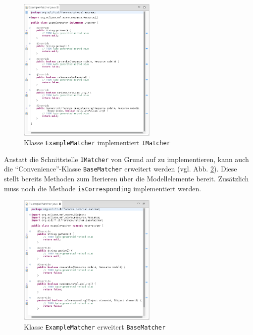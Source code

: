 \begin{figure}[H]
\centering
\includegraphics[width=0.6\textwidth]{matching/graphics/silift-plugin_matcher_imatcher.png}
\caption{Klasse \texttt{ExampleMatcher} implementiert \texttt{IMatcher}}
\label{silift-plugin_matcher_imatcher}
\end{figure}

Anstatt die Schnittstelle \texttt{IMatcher} von Grund auf zu implementieren, kann auch die ``Convenience''-Klasse \texttt{BaseMatcher} erweitert werden (vgl. Abb. \ref{silift-plugin_matcher_basematcher}).
Diese stellt bereits Methoden zum Iterieren über die Modellelemente bereit.
Zusätzlich muss noch die Methode \texttt{isCorresponding} implementiert werden.

\begin{figure}[H]
\centering
\includegraphics[width=0.6\textwidth]{matching/graphics/silift-plugin_matcher_basematcher.png}
\caption{Klasse \texttt{ExampleMatcher} erweitert \texttt{BaseMatcher}}
\label{silift-plugin_matcher_basematcher}
\end{figure}

